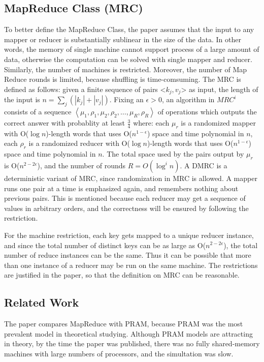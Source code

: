 \documentclass[]{report}
\begin{document}
	\subsection*{MapReduce Class (MRC)}
		To better define the MapReduce Class, the paper assumes that the input to any mapper or reducer is substantially sublinear in the size of the data. In other words, the memory of single machine cannot support process of a large amount of data, otherwise the computation can be solved with single mapper and reducer. Similarly, the number of machines is restricted. Moreover, the number of Map Reduce rounds is limited, because shuffling is time-comsuming. The MRC is defined as follows: given a finite sequence of pairs <$k_{j}, v_{j}$> as input, the length of the input is $n=\sum_{j}(|k_{j}|+|v_{j}|)$. Fixing an $\epsilon>0$, an algorithm in $MRC^{i}$ consists of a sequence $\left\langle\mu_{1}, \rho_{1}, \mu_{2}, \rho_{2}, \ldots, \mu_{R}, \rho_{R}\right\rangle$ of operations which outputs the correct answer with probablity at least $\frac{3}{4}$ where: each $\mu_{r}$ is a randomized mapper with O($\log n$)-length words that uses O($n^{1-\epsilon}$) space and time polynomial in $n$, each $\rho_{r}$ is a randomized reducer with O($\log n$)-length words that uses O($n^{1-\epsilon}$) space and time polynomial in $n$. The total space used by the pairs output by $\mu_{r}$ is O($n^{2-2\epsilon}$), and the number of rounds $R=O(\log^{i}n)$. A DMRC is a deterministic variant of MRC, since randomization in MRC is allowed. A mapper runs one pair at a time is emphasized again, and remembers nothing about previous pairs. This is mentioned because each reducer may get a sequence of values in arbitrary orders, and the correctness will be ensured by following the restriction.
		
		For the machine restriction, each key gets mapped to a unique reducer instance, and since the total number of distinct keys can be as large as O($n^{2-2\epsilon}$), the total number of reduce instances can be the same. Thus it can be possible that more than one instance of a reducer may be run on the same machine. The restrictions are justified in the paper, so that the definition on MRC can be reasonable.
	\subsection*{Related Work}
		The paper compares MapReduce with PRAM, because PRAM was the most prevalent model in theoretical studying. Although PRAM models are attracting in theory, by the time the paper was published, there was no fully shared-memory machines with large numbers of processors, and the simultation was slow.
		
\end{document}
